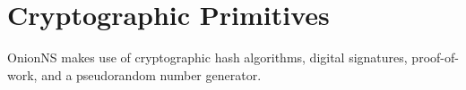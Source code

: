






\section{Cryptographic Primitives}

OnionNS makes use of cryptographic hash algorithms, digital signatures, proof-of-work, and a pseudorandom number generator.

